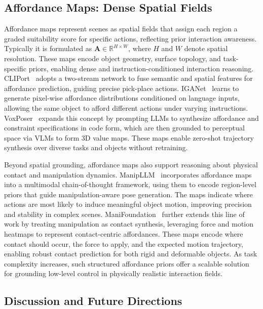 \documentclass[10pt, a4paper, logo, copyright]{googledeepmind} %
\begin{document}
\subsection{Affordance Maps: Dense Spatial Fields}
Affordance maps represent scenes as spatial fields that assign each region a graded suitability score for specific actions, reflecting prior interaction awareness. Typically it is formulated as $\mathbf{A} \in \mathbb{R}^{H \times W}$, where $H$ and $W$ denote spatial resolution. These maps encode object geometry, surface topology, and task-specific priors, enabling dense and instruction-conditioned interaction reasoning. CLIPort~\cite{shridhar2021cliportpathwaysroboticmanipulation} adopts a two-stream network to fuse semantic and spatial features for affordance prediction, guiding precise pick-place actions. IGANet~\cite{li2024learning} learns to generate pixel-wise affordance distributions conditioned on language inputs, allowing the same object to afford different actions under varying instructions. VoxPoser~\cite{huang2023voxposer} expands this concept by prompting LLMs to synthesize affordance and constraint specifications in code form, which are then grounded to perceptual space via VLMs to form 3D value maps. These maps enable zero-shot trajectory synthesis over diverse tasks and objects without retraining. 

Beyond spatial grounding, affordance maps also support reasoning about physical contact and manipulation dynamics. ManipLLM~\cite{10656630} incorporates affordance maps into a multimodal chain-of-thought framework, using them to encode region-level priors that guide manipulation-aware pose generation. The maps indicate where actions are most likely to induce meaningful object motion, improving precision and stability in complex scenes. ManiFoundation~\cite{xu2024manifoundation} further extends this line of work by treating manipulation as contact synthesis, leveraging force and motion heatmaps to represent contact-centric affordances. These maps encode where contact should occur, the force to apply, and the expected motion trajectory, enabling robust contact prediction for both rigid and deformable objects. As task complexity increases, such structured affordance priors offer a scalable solution for grounding low-level control in physically realistic interaction fields.

\subsection{Discussion and Future Directions}
\end{document}

